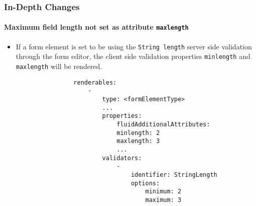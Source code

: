 
\begin{frame}[fragile]
	\frametitle{In-Depth Changes}
	\framesubtitle{Maximum field length not set as attribute \texttt{maxlength}}

	\lstset{basicstyle=\tiny\ttfamily}

	\begin{itemize}
		\item If a form element is set to be using the \texttt{String length} server side validation through
			the form editor, the client side validation properties \texttt{minlength} and
			\texttt{maxlength} will be rendered.

			\begin{lstlisting}
				renderables:
				    -
				        type: <formElementType>
				        ...
				        properties:
				            fluidAdditionalAttributes:
				            minlength: 2
				            maxlength: 3
				            ...
				        validators:
				            -
				                identifier: StringLength
				                options:
				                    minimum: 2
				                    maximum: 3
			\end{lstlisting}
	\end{itemize}

\end{frame}


